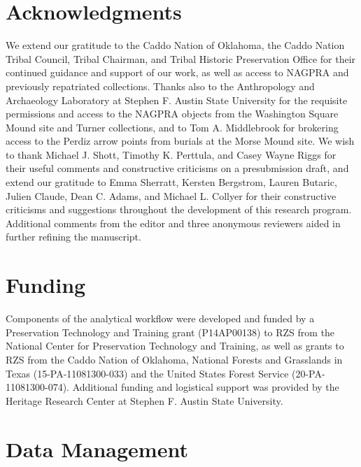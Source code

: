 \documentclass[smallextended]{svjour3}       %
\begin{document}
\hypertarget{acknowledgments}{%
\section*{Acknowledgments}\label{acknowledgments}}

We extend our gratitude to the Caddo Nation of Oklahoma, the Caddo
Nation Tribal Council, Tribal Chairman, and Tribal Historic Preservation
Office for their continued guidance and support of our work, as well as
access to NAGPRA and previously repatriated collections. Thanks also to
the Anthropology and Archaeology Laboratory at Stephen F. Austin State
University for the requisite permissions and access to the NAGPRA
objects from the Washington Square Mound site and Turner collections,
and to Tom A. Middlebrook for brokering access to the Perdiz arrow
points from burials at the Morse Mound site. We wish to thank Michael J.
Shott, Timothy K. Perttula, and Casey Wayne Riggs for their useful
comments and constructive criticisms on a presubmission draft, and
extend our gratitude to Emma Sherratt, Kersten Bergstrom, Lauren
Butaric, Julien Claude, Dean C. Adams, and Michael L. Collyer for their
constructive criticisms and suggestions throughout the development of
this research program. Additional comments from the editor and three
anonymous reviewers aided in further refining the manuscript.

\hypertarget{funding}{%
\section*{Funding}\label{funding}}

Components of the analytical workflow were developed and funded by a
Preservation Technology and Training grant (P14AP00138) to RZS from the
National Center for Preservation Technology and Training, as well as
grants to RZS from the Caddo Nation of Oklahoma, National Forests and
Grasslands in Texas (15-PA-11081300-033) and the United States Forest
Service (20-PA-11081300-074). Additional funding and logistical support
was provided by the Heritage Research Center at Stephen F. Austin State
University.

\hypertarget{data-management}{%
\section*{Data Management}\label{data-management}}
\end{document}
